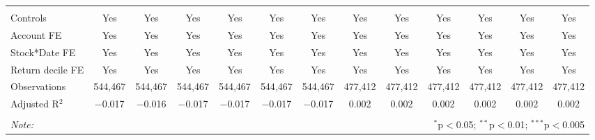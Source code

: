 \begin{tabular}{@{\extracolsep{2pt}}lcccccccccccc}
\hline \\[-1.8ex] 
Controls & Yes & Yes & Yes & Yes & Yes & Yes  & Yes & Yes & Yes & Yes & Yes & Yes \\ 
Account FE & Yes & Yes & Yes & Yes & Yes & Yes  & Yes & Yes & Yes & Yes & Yes & Yes \\ 
Stock*Date FE & Yes & Yes & Yes & Yes & Yes & Yes  & Yes & Yes & Yes & Yes & Yes & Yes  \\ 
Return decile FE & Yes & Yes & Yes & Yes & Yes & Yes  & Yes & Yes & Yes & Yes & Yes & Yes\\ 
Observations & 544,467 & 544,467 & 544,467 & 544,467 & 544,467 & 544,467 & 477,412 & 477,412 & 477,412 & 477,412 & 477,412 & 477,412 \\ 

Adjusted R$^{2}$ & $-$0.017 & $-$0.016 & $-$0.017 & $-$0.017 & $-$0.017 & $-$0.017 & 0.002 & 0.002 & 0.002 & 0.002 & 0.002 & 0.002 \\ 

\hline 
\hline \\[-1.8ex] 
\textit{Note:}  & \multicolumn{12}{r}{$^{*}$p$<$0.05; $^{**}$p$<$0.01; $^{***}$p$<$0.005} \\ 
\end{tabular} 

